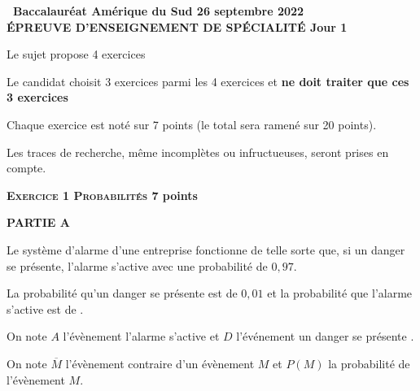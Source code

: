 \documentclass[11pt]{article}
\begin{document}
\setlength\parindent{0mm}
\pagestyle{fancy}
\thispagestyle{empty}

\begin{center}{\Large\textbf{\decofourleft~Baccalauréat Amérique du Sud 26 septembre 2022~\decofourright\\[6pt] ÉPREUVE D'ENSEIGNEMENT DE SPÉCIALITÉ Jour 1}}
\end{center}

\vspace{0,25cm}

Le sujet propose 4 exercices

Le candidat choisit 3 exercices parmi les 4 exercices et \textbf{ne doit traiter que ces 3 exercices}

\medskip

Chaque exercice est noté sur 7 points (le total sera ramené sur 20 points).

Les traces de recherche, même incomplètes ou infructueuses, seront prises en compte.

\bigskip

\textbf{\textsc{Exercice 1 Probabilités} \hfill 7 points}

\medskip

\textbf{PARTIE A}

\medskip

Le système d'alarme d'une entreprise fonctionne de telle sorte que, si un danger se présente, l'alarme s'active avec une probabilité de $0,97$. 

La probabilité qu'un danger se présente est de $0,01$ et la probabilité que l'alarme s'active est de .

On note $A$ l'évènement \og  l'alarme s'active \fg{}  et $D$ l'événement \og  un danger se présente \fg . 

On note $\overline{M}$ l'évènement contraire d'un évènement $M$ et $P(M)$ la probabilité de l'évènement $M$.

\medskip
\end{document}
